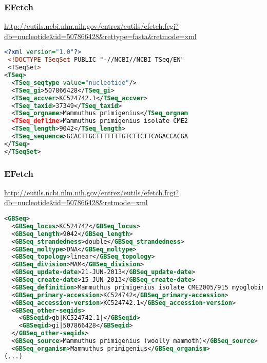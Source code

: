 \documentclass{beamer}
\begin{document}
\begin{frame}[fragile]
\frametitle{EFetch}
\url{http://eutils.ncbi.nlm.nih.gov/entrez/eutils/efetch.fcgi?db=nucleotide&id=507866428&rettype=fasta&retmode=xml}
\begin{lstlisting}[language=xml,basicstyle=\tiny,breaklines=false]
<?xml version="1.0"?>
 <!DOCTYPE TSeqSet PUBLIC "-//NCBI//NCBI TSeq/EN" 
 <TSeqSet>
<TSeq>
  <TSeq_seqtype value="nucleotide"/>
  <TSeq_gi>507866428</TSeq_gi>
  <TSeq_accver>KC524742.1</TSeq_accver>
  <TSeq_taxid>37349</TSeq_taxid>
  <TSeq_orgname>Mammuthus primigenius</TSeq_orgnam
  <TSeq_defline>Mammuthus primigenius isolate CME2
  <TSeq_length>9042</TSeq_length>
  <TSeq_sequence>GCACTTGCTTTTTTTGTCTTCTTCAGACCACGA
</TSeq>
</TSeqSet>
\end{lstlisting}
\end{frame}


\begin{frame}[fragile]
\frametitle{EFetch}
\url{http://eutils.ncbi.nlm.nih.gov/entrez/eutils/efetch.fcgi?db=nucleotide&id=507866428&retmode=xml}
\begin{lstlisting}[language=xml,basicstyle=\tiny,breaklines=false]
<GBSeq>
  <GBSeq_locus>KC524742</GBSeq_locus>
  <GBSeq_length>9042</GBSeq_length>
  <GBSeq_strandedness>double</GBSeq_strandedness>
  <GBSeq_moltype>DNA</GBSeq_moltype>
  <GBSeq_topology>linear</GBSeq_topology>
  <GBSeq_division>MAM</GBSeq_division>
  <GBSeq_update-date>21-JUN-2013</GBSeq_update-date>
  <GBSeq_create-date>15-JUN-2013</GBSeq_create-date>
  <GBSeq_definition>Mammuthus primigenius isolate CME2005/915 myoglobin (Mb) gene, partial cds</GBSeq_definition>
  <GBSeq_primary-accession>KC524742</GBSeq_primary-accession>
  <GBSeq_accession-version>KC524742.1</GBSeq_accession-version>
  <GBSeq_other-seqids>
    <GBSeqid>gb|KC524742.1|</GBSeqid>
    <GBSeqid>gi|507866428</GBSeqid>
  </GBSeq_other-seqids>
  <GBSeq_source>Mammuthus primigenius (woolly mammoth)</GBSeq_source>
  <GBSeq_organism>Mammuthus primigenius</GBSeq_organism>
(...)
\end{lstlisting}
\end{frame}
\end{document}
